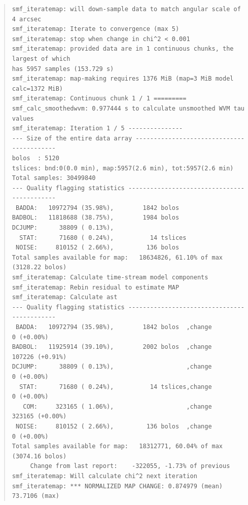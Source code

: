 \documentclass[twoside,11pt]{article}
\renewcommand{\_}{\texttt{\symbol{95}}}
\newenvironment{myquote}{\begin{quote}\begin{small}}{\end{small}\end{quote}}
\begin{document}
\begin{myquote}
\begin{verbatim}
smf_iteratemap: will down-sample data to match angular scale of 4 arcsec
smf_iteratemap: Iterate to convergence (max 5)                          
smf_iteratemap: stop when change in chi^2 < 0.001                       
smf_iteratemap: provided data are in 1 continuous chunks, the largest of which
has 5957 samples (153.729 s)                                                  
smf_iteratemap: map-making requires 1376 MiB (map=3 MiB model calc=1372 MiB)  
smf_iteratemap: Continuous chunk 1 / 1 =========                              
smf_calc_smoothedwvm: 0.977444 s to calculate unsmoothed WVM tau values       
smf_iteratemap: Iteration 1 / 5 ---------------                               
--- Size of the entire data array ------------------------------------------  
bolos  : 5120                                                                 
tslices: bnd:0(0.0 min), map:5957(2.6 min), tot:5957(2.6 min)                 
Total samples: 30499840                                                       
--- Quality flagging statistics --------------------------------------------  
 BADDA:   10972794 (35.98%),        1842 bolos                                
BADBOL:   11818688 (38.75%),        1984 bolos                                
DCJUMP:      38809 ( 0.13%),                                                  
  STAT:      71680 ( 0.24%),          14 tslices                              
 NOISE:     810152 ( 2.66%),         136 bolos                                
Total samples available for map:   18634826, 61.10% of max (3128.22 bolos)    
smf_iteratemap: Calculate time-stream model components                        
smf_iteratemap: Rebin residual to estimate MAP                                
smf_iteratemap: Calculate ast                                                 
--- Quality flagging statistics --------------------------------------------  
 BADDA:   10972794 (35.98%),        1842 bolos  ,change          0 (+0.00%)   
BADBOL:   11925914 (39.10%),        2002 bolos  ,change     107226 (+0.91%)   
DCJUMP:      38809 ( 0.13%),                    ,change          0 (+0.00%)   
  STAT:      71680 ( 0.24%),          14 tslices,change          0 (+0.00%)   
   COM:     323165 ( 1.06%),                    ,change     323165 (+0.00%)   
 NOISE:     810152 ( 2.66%),         136 bolos  ,change          0 (+0.00%)   
Total samples available for map:   18312771, 60.04% of max (3074.16 bolos)    
     Change from last report:    -322055, -1.73% of previous                  
smf_iteratemap: Will calculate chi^2 next iteration                           
smf_iteratemap: *** NORMALIZED MAP CHANGE: 0.874979 (mean) 73.7106 (max)      

\end{verbatim}
\end{myquote}
\end{document}
